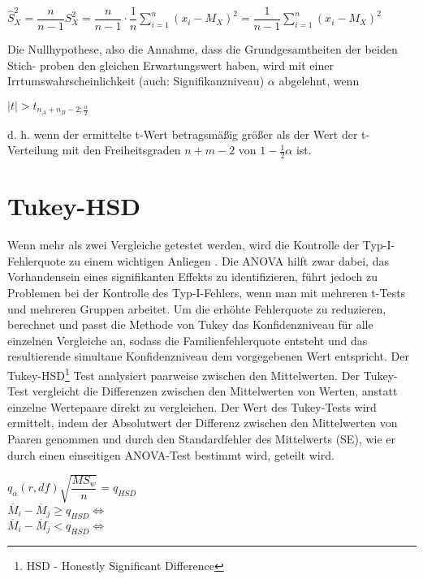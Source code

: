 \begin{center}
  $\hat{S}_X^2 = \dfrac{n}{n-1} S_X^2 = \dfrac{n}{n-1} \cdot \dfrac{1}{n} \sum_{i=1}^n (x_i - M_X)^2 = \dfrac{1}{n-1} \sum_{i=1}^n (x_i - M_X)^2$
\end{center}

Die Nullhypothese, also die Annahme, dass die Grundgesamtheiten der beiden Stich-
proben den gleichen Erwartungswert haben, wird mit einer Irrtumswahrscheinlichkeit
(auch: Signifikanzniveau) $\alpha$ abgelehnt, wenn

\begin{center}
  $|t| > t_{n_A + n_B - 2; \frac{\alpha}{2}}$
\end{center}

d. h. wenn der ermittelte t-Wert betragsmäßig größer als der Wert der t-Verteilung
mit den Freiheitsgraden $n + m - 2$ von $1 - \frac{1}{2}\alpha$ ist.



\section{Tukey-HSD}
Wenn mehr als zwei Vergleiche getestet werden, wird die Kontrolle der Typ-I-Fehlerquote zu einem wichtigen Anliegen \cite{tukey_HSD} \cite{tukey_hsd_book}. 
Die ANOVA hilft zwar dabei, das Vorhandensein eines signifikanten Effekts zu identifizieren, 
führt jedoch zu Problemen bei der Kontrolle des Typ-I-Fehlers, wenn man mit mehreren t-Tests und mehreren Gruppen arbeitet.
Um die erhöhte Fehlerquote zu reduzieren, berechnet und passt die Methode von Tukey das Konfidenzniveau für alle einzelnen Vergleiche an, 
sodass die Familienfehlerquote entsteht und das resultierende simultane Konfidenzniveau dem vorgegebenen Wert entspricht.
Der Tukey-HSD\footnote{HSD - Honestly Significant Difference} Test analysiert paarweise
zwischen den Mittelwerten.
Der Tukey-Test vergleicht die Differenzen zwischen den Mittelwerten von Werten, anstatt einzelne Wertepaare direkt zu vergleichen. 
Der Wert des Tukey-Tests wird ermittelt, indem der Absolutwert der Differenz zwischen den Mittelwerten von Paaren genommen und 
durch den Standardfehler des Mittelwerts (SE), wie er durch einen einseitigen ANOVA-Test bestimmt wird, geteilt wird.

\begin{center}
  $q_{\alpha}(r, df){\sqrt{\dfrac{MS_w}{n}}} = q_{HSD}$ \\
  $\overline{M}_i - \overline{M}_j \geq q_{HSD} \iff$  \\
  $\overline{M}_i - \overline{M}_j < q_{HSD} \iff$  
\end{center}

